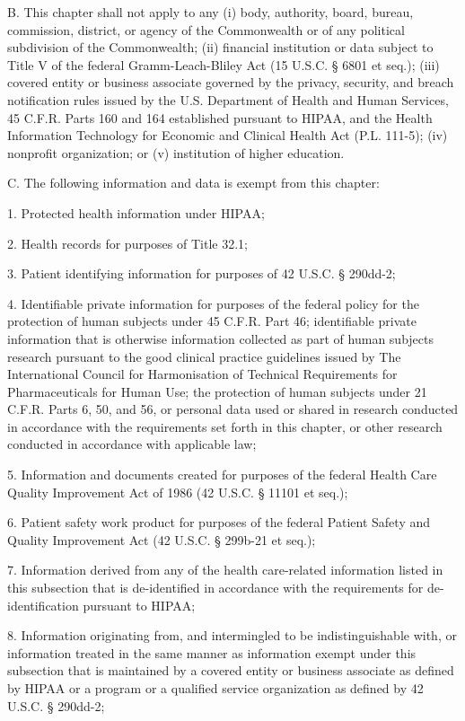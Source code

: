B. This chapter shall not apply to any (i) body, authority, board, bureau, commission, district, or agency of the Commonwealth or of any political subdivision of the Commonwealth; (ii) financial institution or data subject to Title V of the federal Gramm-Leach-Bliley Act (15 U.S.C. § 6801 et seq.); (iii) covered entity or business associate governed by the privacy, security, and breach notification rules issued by the U.S. Department of Health and Human Services, 45 C.F.R. Parts 160 and 164 established pursuant to HIPAA, and the Health Information Technology for Economic and Clinical Health Act (P.L. 111-5); (iv) nonprofit organization; or (v) institution of higher education.

C. The following information and data is exempt from this chapter:

1. Protected health information under HIPAA;

2. Health records for purposes of Title 32.1;

3. Patient identifying information for purposes of 42 U.S.C. § 290dd-2;

4. Identifiable private information for purposes of the federal policy for the protection of human subjects under 45 C.F.R. Part 46; identifiable private information that is otherwise information collected as part of human subjects research pursuant to the good clinical practice guidelines issued by The International Council for Harmonisation of Technical Requirements for Pharmaceuticals for Human Use; the protection of human subjects under 21 C.F.R. Parts 6, 50, and 56, or personal data used or shared in research conducted in accordance with the requirements set forth in this chapter, or other research conducted in accordance with applicable law;

5. Information and documents created for purposes of the federal Health Care Quality Improvement Act of 1986 (42 U.S.C. § 11101 et seq.);

6. Patient safety work product for purposes of the federal Patient Safety and Quality Improvement Act (42 U.S.C. § 299b-21 et seq.);

7. Information derived from any of the health care-related information listed in this subsection that is de-identified in accordance with the requirements for de-identification pursuant to HIPAA;

8. Information originating from, and intermingled to be indistinguishable with, or information treated in the same manner as information exempt under this subsection that is maintained by a covered entity or business associate as defined by HIPAA or a program or a qualified service organization as defined by 42 U.S.C. § 290dd-2;

